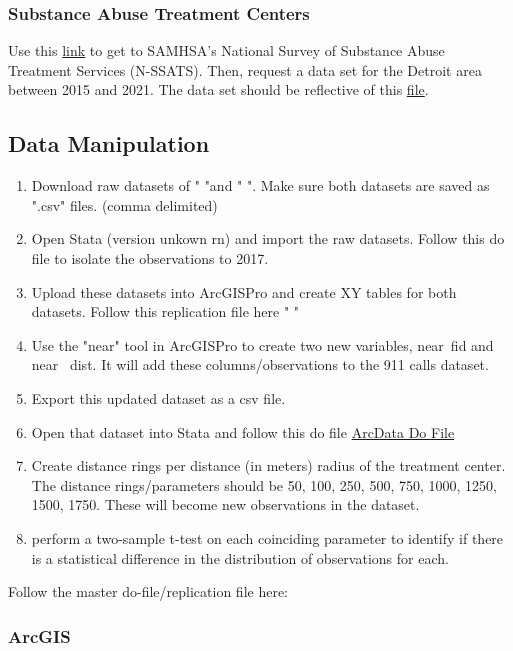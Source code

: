 \documentclass[12pt]{article}
\begin{document}
\subsubsection{Substance Abuse Treatment Centers}
Use this \href{https://www.samhsa.gov/data/data-we-collect/n-ssats-national-survey-substance-abuse-treatment-services}{link} to get to SAMHSA's National Survey of Substance Abuse Treatment Services (N-SSATS). Then, request a data set for the Detroit area between 2015 and 2021. The data set should be reflective of this \href{https://github.com/ecn310/course-project-zipcentercrime/blob/main/detroit_samhsa_sud_2015_2021.dta}{file}.

\subsection{Data Manipulation}
\begin{enumerate}
    \item Download raw datasets of " "and " ". Make sure both datasets are saved as ".csv" files. (comma delimited)
    \item Open Stata (version unkown rn) and import the raw datasets. Follow this do file to isolate the observations to 2017.
    \item Upload these datasets into ArcGISPro and create XY tables for both datasets. Follow this replication file here " "
    \item Use the "near" tool in ArcGISPro to create two new variables, near\textunderscore\ fid and near \textunderscore\ dist. It will add these columns/observations to the 911 calls dataset. 
    \item Export this updated dataset as a csv file. 
    \item Open that dataset into Stata and follow this do file \href{C:\Users\sorti\OneDrive\Desktop\ArcDataDo.do.txt}{ArcData Do File}
    \item Create distance rings per distance (in meters) radius of the treatment center. The distance rings/parameters should be 50, 100, 250, 500, 750, 1000, 1250, 1500, 1750. These will become new observations in the dataset. 
    \item perform a two-sample t-test on each coinciding parameter to identify if there is a statistical difference in the distribution of observations for each. 
\end{enumerate}
Follow the master do-file/replication file here: 
\subsubsection{ArcGIS}
\end{document}
